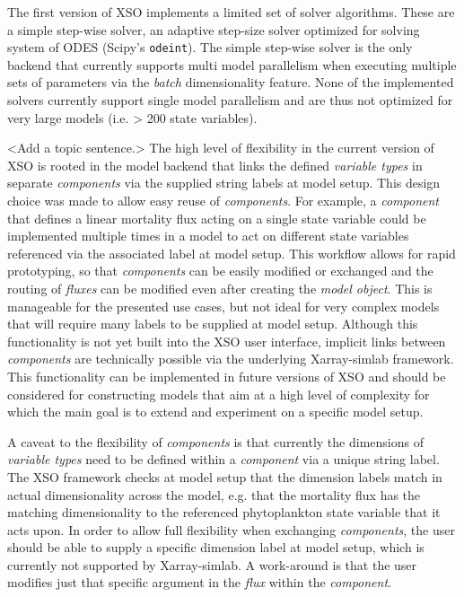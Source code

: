 \documentclass[journal abbreviation, manuscript]{copernicus}
\begin{document}
The first version of XSO implements a limited set of solver algorithms. These are a simple step-wise solver, an adaptive step-size solver optimized for solving system of ODES (Scipy's \texttt{odeint}). The simple step-wise solver is the only backend that currently supports multi model parallelism when executing multiple sets of parameters via the \textit{batch} dimensionality feature. None of the implemented solvers currently support single model parallelism and are thus not optimized for very large models (i.e. > 200 state variables).

<Add a topic sentence.> The high level of flexibility in the current version of XSO is rooted in the model backend that links the defined \textit{variable types} in separate \textit{components} via the supplied string labels at model setup. This design choice was made to allow easy reuse of \textit{components}. For example, a \textit{component} that defines a linear mortality flux acting on a single state variable could be implemented multiple times in a model to act on different state variables referenced via the associated label at model setup. This workflow allows for rapid prototyping, so that \textit{components} can be easily modified or exchanged and the routing of \textit{fluxes} can be modified even after creating the \textit{model object}. This is manageable for the presented use cases, but not ideal for very complex models that will require many labels to be supplied at model setup. Although this functionality is not yet built into the XSO user interface, implicit links between \textit{components} are technically possible via the underlying Xarray-simlab framework. This functionality can be implemented in future versions of XSO and should be considered for constructing models that aim at a high level of complexity for which the main goal is to extend and experiment on a specific model setup.

A caveat to the flexibility of \textit{components} is that currently the dimensions of \textit{variable types} need to be defined within a \textit{component} via a unique string label. The XSO framework checks at model setup that the dimension labels match in actual dimensionality across the model, e.g. that the mortality flux has the matching dimensionality to the referenced phytoplankton state variable that it acts upon. In order to allow full flexibility when exchanging \textit{components}, the user should be able to supply a specific dimension label at model setup, which is currently not supported by Xarray-simlab. A work-around is that the user modifies just that specific argument in the \textit{flux} within the \textit{component}.
\end{document}

